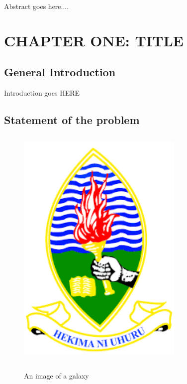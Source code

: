\documentclass[12pt]{report}    %
\begin{document}
Abstract goes here.... 
\begin{center}
    
\cleardoublepage %
\tableofcontents

\listoftables


\cleardoublepage
\listoffigures
\end{center} 
\newpage



\chapter{\MakeUppercase{chapter one: title}} 
\section{General Introduction} 
\blindtext
Introduction goes HERE
\section{Statement of the problem}
\blindtext


\begin{figure}[htp]
    \centering
    {\includegraphics[width=8cm, height= 12cm]{image/logo}}
    \caption{An image of a galaxy}
    \label{fig:galaxy}
\end{figure}
\end{document}
